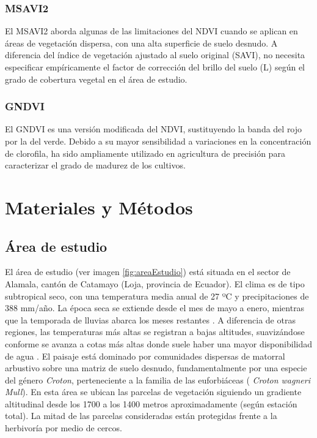 \documentclass[spanish,openany]{article}
\begin{document}
\subsubsection{MSAVI2}\label{msavi2}

El MSAVI2 \citep{Qi1994} aborda algunas de las limitaciones del NDVI
cuando se aplican en áreas de vegetación dispersa, con una alta
superficie de suelo desnudo. A diferencia del índice de vegetación
ajustado al suelo original (SAVI), no necesita especificar empíricamente
el factor de corrección del brillo del suelo (L) según el grado de
cobertura vegetal en el área de estudio.

\subsubsection{GNDVI}\label{gndvi}

El GNDVI \citep{Gitelson1998} es una versión modificada del NDVI,
sustituyendo la banda del rojo por la del verde. Debido a su mayor
sensibilidad a variaciones en la concentración de clorofila, ha sido
ampliamente utilizado en agricultura de precisión para caracterizar el
grado de madurez de los cultivos.

\section{Materiales y Métodos}\label{method}

\subsection{Área de estudio}\label{area-de-estudio}

El área de estudio (ver imagen \ref{fig:areaEstudio}) está situada en el
sector de Alamala, cantón de Catamayo (Loja, provincia de Ecuador). El
clima es de tipo subtropical seco, con una temperatura media anual de 27
ºC y precipitaciones de 388 mm/año. La época seca se extiende desde el
mes de mayo a enero, mientras que la temporada de lluvias abarca los
meses restantes \citep{sierra1999propuesta}. A diferencia de otras
regiones, las temperaturas más altas se registran a bajas altitudes,
suavizándose conforme se avanza a cotas más altas donde suele haber una
mayor disponibilidad de agua \citep{Espinosa2014}. El paisaje está
dominado por comunidades dispersas de matorral arbustivo sobre una
matriz de suelo desnudo, fundamentalmente por una especie del género
\emph{Croton}, perteneciente a la familia de las euforbiáceas (
\emph{Croton wagneri Mull}). En esta área se ubican las parcelas de
vegetación siguiendo un gradiente altitudinal desde los 1700 a los 1400
metros aproximadamente (según estación total). La mitad de las parcelas
consideradas están protegidas frente a la herbivoría por medio de
cercos.
\end{document}
